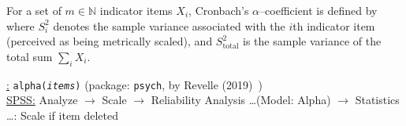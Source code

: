 %
For a set of $m \in \mathbb{N}$ indicator items $X_{i}$, 
Cronbach's $\alpha$--coefficient is defined by
%
\be
{}
\ee
%
where $S_{i}^{2}$ denotes the sample variance associated with the 
$i$th indicator item (perceived as being metrically scaled),
and $S_\mathrm{total}^{2}$ is the sample variance of the total sum 
${\displaystyle\sum_{i}X_{i}}$.

\medskip
\noindent
\underline{\R:} \texttt{alpha({\it items\/})} (package:
\texttt{psych}, by Revelle (2019)~) \\
\underline{SPSS:} Analyze $\rightarrow$ Scale $\rightarrow$ 
Reliability Analysis \ldots (Model: Alpha) $\rightarrow$ 
Statistics \ldots: Scale if item deleted

